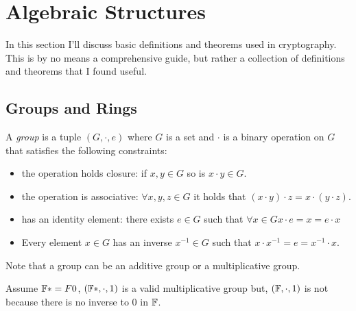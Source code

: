 
\chapter{Algebraic Structures}

In this section I'll discuss basic definitions and theorems used in cryptography.
This is by no means a comprehensive guide, 
but rather a collection of definitions and theorems that I found useful.


\section{Groups and Rings}


\begin{definition}
    A \emph{group} is a tuple $(G,\cdot,e)$ where $G$ is a set and $\cdot$ is a binary operation on $G$
    that satisfies the following constraints:
    \begin{itemize}
        \item the operation holds closure: if $x,y\in G$ so is $x\cdot y\in G$.
        \item the operation is associative: $\forall x,y,z\in G$ it holds that $(x\cdot y)\cdot z = x\cdot (y\cdot z)$.
        \item has an identity element: there exists $e\in G$ such that $\forall x\in G x\cdot e = x = e\cdot x$
        \item Every element $x\in G$ has an inverse $x^{-1}\in G$ such that $x\cdot x^{-1} = e = x^{-1} \cdot x$.
    \end{itemize}
\end{definition}


\begin{remark}
    Note that a group can be an additive group or a multiplicative group.
\end{remark}
\begin{example}
    Assume $\mathbb{F}*=F\\{0}$, $(\mathbb{F}*, \cdot, 1)$ is a valid multiplicative group but,
    $(\mathbb{F}, \cdot, 1)$ is not because there is no inverse to $0$ in $\mathbb{F}$.
\end{example}

